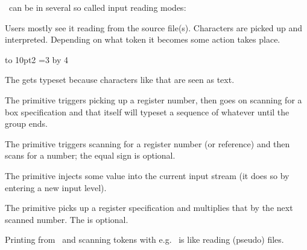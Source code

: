 




\startdocument
  [title={PROGRAMMING},
   banner={local control},
   location={context\enspace {\bf 2021}\enspace meeting}]

\starttitle[title=Expansion]

\TEX\ can be in several so called input reading modes:

Users mostly see it reading from the source file(s). Characters are picked up and
interpreted. Depending on what token it becomes some action takes place.

 \hbox to 10pt{2} =3 \the{} \multiply{} by 4
\stoptyping

\startitemize

\startitem
    The  gets typeset because characters like that are seen as text.
\stopitem

\startitem
    The \type {\setbox} primitive triggers picking up a register number, then
    goes on scanning for a box specification and that itself will typeset a
    sequence of whatever until the group ends.
\stopitem

\startitem
    The  primitive triggers scanning for a register number (or
    reference) and then scans for a number; the equal sign is optional.
\stopitem

\startitem
    The  primitive injects some value into the current input stream
    (it does so by entering a new input level).
\stopitem

\startitem
    The  primitive picks up a register specification and
    multiplies that by the next scanned number. The  is optional.
\stopitem

\startitem
    Printing from \LUA\ and scanning tokens with e.g.\ \type {\scantokens} is like
    reading (pseudo) files.
\stopitem

\stopitemize

\stoptitle

\starttitle[title=Expansion]

\startbuffer[def]
\stopbuffer

\startbuffer[edef]
\edef{}
\stopbuffer

